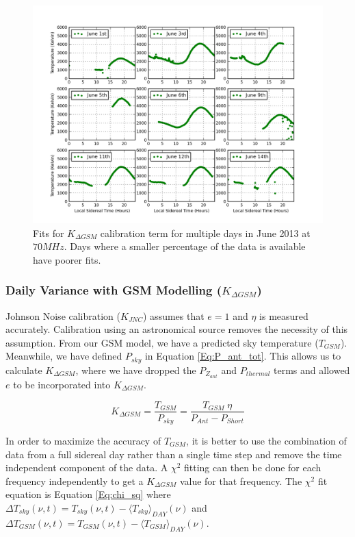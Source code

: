 \begin{figure}[htb]
\begin{center}
\includegraphics[width=0.95\linewidth]{Data_analysis/figures/Combined_Kdgsm_time_series.png}
\caption{Fits for $K_{\Delta GSM}$ calibration term for multiple days in June 2013 at $70 MHz$. Days where a smaller percentage of the data is available have poorer fits. }
\label{Fig:Kdgsm_var}
\end{center}
\end{figure}

\subsubsection{Daily Variance with GSM Modelling ($K_{\Delta GSM}$)}\label{Sec:KGSM}

Johnson Noise calibration ($K_{JNC}$) assumes that $e = 1$ and $\eta$ is measured accurately. Calibration using an astronomical source removes the necessity of this assumption. From our GSM model, we have a predicted sky temperature ($T_{GSM}$). Meanwhile, we have defined $P_{sky}$ in Equation \ref{Eq:P_ant_tot}. This allows us to calculate $K_{\Delta GSM}$, where we have dropped the $P_{Z_{ant}}$ and $P_{thermal}$ terms and allowed $e$ to be incorporated into $K_{\Delta GSM}$. 

\begin{equation}
K_{\Delta GSM} = \frac{T_{GSM}}{P_{sky}} = \frac{T_{GSM} \; \eta}{ P_{Ant}-P_{Short}}
\end{equation}

In order to maximize the accuracy of $T_{GSM}$, it is better to use the combination of data from a full sidereal day rather than a single time step and remove the time independent component of the data. A $\chi^2$ fitting can then be done  for each frequency independently to get a $K_{\Delta GSM}$ value for that frequency. The $\chi^2$ fit equation is Equation \ref{Eq:chi_sq} where $\Delta T_{sky} (\nu, t) = T_{sky}(\nu,t)-\langle T_{sky} \rangle_{DAY} (\nu)$ and $\Delta T_{GSM} (\nu,t) = T_{GSM}(\nu,t)-\langle T_{GSM} \rangle_{DAY} (\nu)$. 

